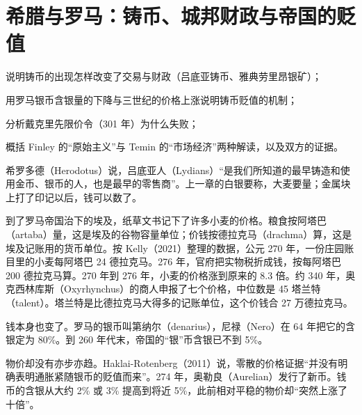 \chapter{希腊与罗马：铸币、城邦财政与帝国的贬值}\label{ch:greekroman}

\begin{chapterguide}
\begin{guidegoals}
\item 说明铸币的出现怎样改变了交易与财政（吕底亚铸币、雅典劳里昂银矿）；
\item 用罗马银币含银量的下降与三世纪的价格上涨说明铸币贬值的机制；
\item 分析戴克里先限价令（301 年）为什么失败；
\item 概括 Finley 的“原始主义”与 Temin 的“市场经济”两种解读，以及双方的证据。
\end{guidegoals}
\end{chapterguide}

希罗多德（Herodotus）说，吕底亚人（Lydians）“是我们所知道的最早铸造和使用金币、银币的人，也是最早的零售商”\cite{herodotus}。上一章的白银要称，大麦要量；金属块上打了印记以后，钱可以数了。

到了罗马帝国治下的埃及，纸草文书记下了许多小麦的价格。粮食按阿塔巴（artaba）量，这是埃及的谷物容量单位；价钱按德拉克马（drachma）算，这是埃及记账用的货币单位。按 Kelly（2021）整理的数据，公元 270 年，一份庄园账目里的小麦每阿塔巴 24 德拉克马。276 年，官府把实物税折成钱，按每阿塔巴 200 德拉克马算。270 年到 276 年，小麦的价格涨到原来的 8.3 倍。约 340 年，奥克西林库斯（Oxyrhynchus）的商人申报了七个价格，中位数是 45 塔兰特（talent）。塔兰特是比德拉克马大得多的记账单位，这个价钱合 27 万德拉克马\cite{kelly2021}。

钱本身也变了。罗马的银币叫第纳尔（denarius），尼禄（Nero）在 64 年把它的含银定为 80\%。到 260 年代末，帝国的“银”币含银已不到 5\%\cite{haklai2011}。

物价却没有亦步亦趋。Haklai-Rotenberg（2011）说，零散的价格证据“并没有明确表明通胀紧随银币的贬值而来”。274 年，奥勒良（Aurelian）发行了新币。钱币的含银从大约 2\% 或 3\% 提高到将近 5\%，此前相对平稳的物价却“突然上涨了十倍”\cite{haklai2011}。

